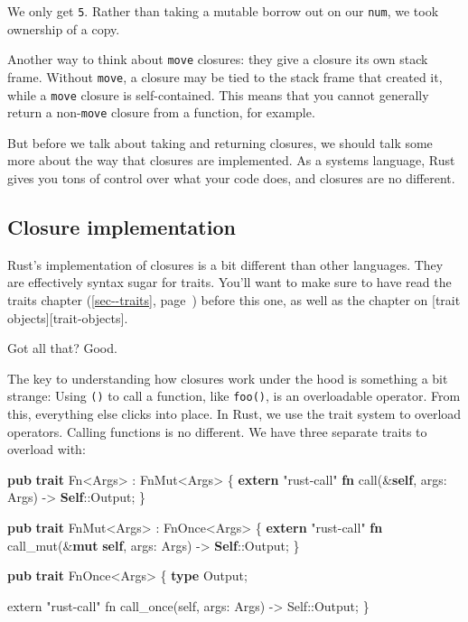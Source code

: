 \documentclass[a4paper,]{book}
\renewcommand*{\hyperref}[2][\ar]{%
  \def\ar{#2}%
  #2 (\autoref{#1}, page~\pageref{#1})}
\newenvironment{Shaded}{\begin{snugshade}}{\end{snugshade}}
\newcommand{\KeywordTok}[1]{\textcolor[rgb]{0.13,0.29,0.53}{\textbf{{#1}}}}
\newcommand{\StringTok}[1]{\textcolor[rgb]{0.31,0.60,0.02}{{#1}}}
\newcommand{\NormalTok}[1]{{#1}}
\begin{document}
We only get \texttt{5}. Rather than taking a mutable borrow out on our
\texttt{num}, we took ownership of a copy.

Another way to think about \texttt{move} closures: they give a closure
its own stack frame. Without \texttt{move}, a closure may be tied to the
stack frame that created it, while a \texttt{move} closure is
self-contained. This means that you cannot generally return a
non-\texttt{move} closure from a function, for example.

But before we talk about taking and returning closures, we should talk
some more about the way that closures are implemented. As a systems
language, Rust gives you tons of control over what your code does, and
closures are no different.

\subsection{Closure implementation}\label{closure-implementation}

Rust's implementation of closures is a bit different than other
languages. They are effectively syntax sugar for traits. You'll want to
make sure to have read the \hyperref[sec--traits]{traits chapter} before
this one, as well as the chapter on {[}trait
objects{]}{[}trait-objects{]}.

Got all that? Good.

The key to understanding how closures work under the hood is something a
bit strange: Using \texttt{()} to call a function, like \texttt{foo()},
is an overloadable operator. From this, everything else clicks into
place. In Rust, we use the trait system to overload operators. Calling
functions is no different. We have three separate traits to overload
with:

\begin{Shaded}
\begin{Highlighting}[]
\KeywordTok{pub} \KeywordTok{trait} \NormalTok{Fn<Args> : FnMut<Args> \{}
    \KeywordTok{extern} \StringTok{"rust-call"} \KeywordTok{fn} \NormalTok{call(&}\KeywordTok{self}\NormalTok{, args: Args) -> }\KeywordTok{Self}\NormalTok{::Output;}
\NormalTok{\}}

\KeywordTok{pub} \KeywordTok{trait} \NormalTok{FnMut<Args> : FnOnce<Args> \{}
    \KeywordTok{extern} \StringTok{"rust-call"} \KeywordTok{fn} \NormalTok{call_mut(&}\KeywordTok{mut} \KeywordTok{self}\NormalTok{, args: Args) -> }\KeywordTok{Self}\NormalTok{::Output;}
\NormalTok{\}}

\KeywordTok{pub} \KeywordTok{trait} \NormalTok{FnOnce<Args> \{}
    \KeywordTok{type} \NormalTok{Output;}

    \NormalTok{extern "rust-call" fn call_once(self, args: Args) -> Self::Output;}
\NormalTok{\}}
\end{Highlighting}
\end{Shaded}
\end{document}
